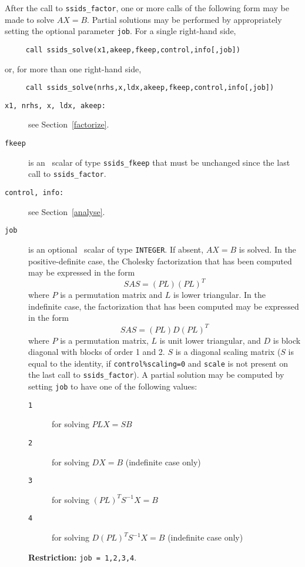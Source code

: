 \documentclass{spral}
\begin{document}
After the call to {\tt ssids\_factor},
one or more calls of the following form may be made to solve
${AX = B}$. Partial solutions may be
performed by appropriately setting the optional
parameter {\tt job}.
For a single right-hand side,
\begin{verbatim}
     call ssids_solve(x1,akeep,fkeep,control,info[,job])
\end{verbatim}
or, for more than one right-hand side,
\begin{verbatim}
     call ssids_solve(nrhs,x,ldx,akeep,fkeep,control,info[,job])
\end{verbatim}

\vspace*{-3mm}
\begin{description}
\item[\texttt{x1{\rm ,} nrhs{\rm ,} x{\rm ,} ldx{\rm ,} akeep{\rm :}}]
see Section~\ref{factorize}.

\item[\texttt{fkeep}]  is an \intentin\ scalar of type
{\tt ssids\_fkeep} that must be unchanged since the
last call to {\tt ssids\_factor}.

\item[\texttt{control{\rm ,} info{\rm :}}] see Section~\ref{analyse}.


\item[\texttt{job}] is an optional  \intentin\ scalar of
type  {\tt INTEGER}. If absent, ${AX = B}$ is solved.
In the positive-definite case, the Cholesky factorization
that has been computed may be expressed in the form
\[ {SAS} = ({PL})({PL})^T \]
where $P$ is a permutation matrix and $L$ is lower triangular.
In the indefinite case, the factorization
that has been computed may be expressed in the form
\[ {S AS} = ({PL}){D}({PL})^T \]
where $P$ is a permutation matrix, $L$ is unit lower triangular,
and $D$ is block diagonal with blocks of order 1 and 2.
$S$ is a diagonal scaling matrix ($S$ is equal to the identity,
if \texttt{control\%scaling=0} and
{\tt scale} is not present on the last call to {\tt ssids\_factor}).
A partial solution may be computed by setting {\tt job} to have
one of the following values:
\begin{description}
\item[\texttt{1}] for solving ${PLX} = {SB}$
\item[\texttt{2}] for solving ${DX} = {B}$ (indefinite case only)
\item[\texttt{3}] for solving $({PL})^T{S^{-1}X} = {B}$
\item[\texttt{4}] for solving $D({PL})^T{S^{-1}X} = {B}$ (indefinite case only)
\end{description}
{\bf Restriction:} {\tt job = 1,2,3,4}.

\end{description}
\end{document}
